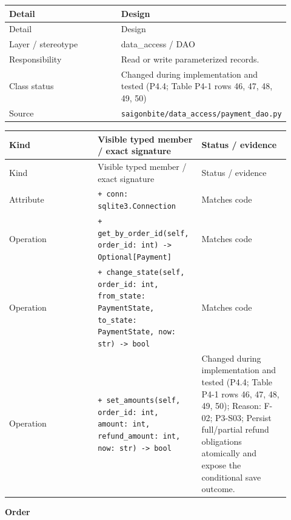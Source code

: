 \begin{longtable}{>{\raggedright\arraybackslash}p{0.4600\linewidth}>{\raggedright\arraybackslash}p{0.4600\linewidth}}
Detail & Design \\
\hline\endfirsthead
Detail & Design \\
\hline\endhead
Layer / stereotype & data\_access / \guillemotleft{}DAO\guillemotright{} \\
Responsibility & Read or write parameterized records. \\
Class status & Changed during implementation and tested (P4.4; Table P4-1 rows 46, 47, 48, 49, 50) \\
Source & \texttt{saigonbite/\allowbreak{}data\_\allowbreak{}access/\allowbreak{}payment\_\allowbreak{}dao.\allowbreak{}py} \\
\end{longtable}
\begin{longtable}{>{\raggedright\arraybackslash}p{0.3067\linewidth}>{\raggedright\arraybackslash}p{0.3067\linewidth}>{\raggedright\arraybackslash}p{0.3067\linewidth}}
Kind & Visible typed member / exact signature & Status / evidence \\
\hline\endfirsthead
Kind & Visible typed member / exact signature & Status / evidence \\
\hline\endhead
Attribute & \texttt{+ conn: sqlite3.\allowbreak{}Connection} & Matches code \\
Operation & \texttt{+ get\_\allowbreak{}by\_\allowbreak{}order\_\allowbreak{}id(self, order\_\allowbreak{}id: int) -\textgreater{} Optional[Payment]} & Matches code \\
Operation & \texttt{+ change\_\allowbreak{}state(self, order\_\allowbreak{}id: int, from\_\allowbreak{}state: PaymentState, to\_\allowbreak{}state: PaymentState, now: str) -\textgreater{} bool} & Matches code \\
Operation & \texttt{+ set\_\allowbreak{}amounts(self, order\_\allowbreak{}id: int, amount: int, refund\_\allowbreak{}amount: int, now: str) -\textgreater{} bool} & Changed during implementation and tested (P4.4; Table P4-1 rows 46, 47, 48, 49, 50); Reason: F-02; P3-S03; Persist full/partial refund obligations atomically and expose the conditional save outcome. \\
\end{longtable}
\textbf{Order}

